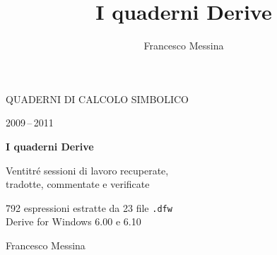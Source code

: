 \documentclass[11pt,a4paper,openright]{book}
\title{I quaderni Derive}
\author{Francesco Messina}
\date{}
\begin{document}
\frontmatter
\pagestyle{empty}

\begin{titlepage}
\centering
\vspace*{3.2cm}

{\sffamily\color{grigiotesto}\large
 QUADERNI DI CALCOLO SIMBOLICO\par
 2009\,--\,2011\par}

\vspace{1.4cm}
{\sffamily\bfseries\color{blunotte}\fontsize{40}{46}\selectfont
 I quaderni Derive\par}

\vspace{0.7cm}
{\sffamily\large\color{inchiostro}
 Ventitr\'e sessioni di lavoro recuperate,\\
 tradotte, commentate e verificate\par}

\vspace{2.2cm}

\vspace{2.2cm}
{\sffamily\color{grigiotesto}
 792 espressioni estratte da 23 file \texttt{.dfw}\\
 Derive for Windows 6.00 e 6.10\par}

\vfill
{\sffamily\color{grigiotesto}\small
 Francesco Messina\par}
\end{titlepage}
\end{document}
